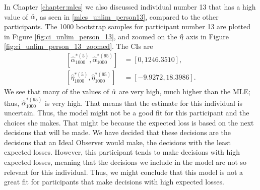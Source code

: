 In Chapter \ref{chapter:mles} we also discussed individual number 13 that has a high value of $\hat{\alpha}$, as seen in \eqref{mles_unlim_person13}, compared to the other participants. The 1000 bootstrap samples for participant number 13 are plotted in Figure \ref{fig:ci_unlim_person_13}, and zoomed on the $\hat{\eta}$ axis in Figure \ref{fig:ci_unlim_person_13_zoomed}. The CIs are
\begin{equation*}
    \begin{aligned}
         \left[ \hat{\alpha}^{*(5)}_{1000},\hat{\alpha}^{*(95)}_{1000}\right] &= [0,1246.3510],\\
         \left[\hat{\eta}^{*(5)}_{1000},\hat{\eta}^{*(95)}_{1000}\right] &= [-9.9272,18.3986].
    \end{aligned}
\end{equation*}
We see that many of the values of $\hat{\alpha}$ are very high, much higher than the MLE; thus, $\hat{\alpha}^{*(95)}_{1000}$ is very high. That means that the estimate for this individual is uncertain. Thus, the model might not be a good fit for this participant and the choices she makes. That might be because the expected loss is based on the next decisions that will be made. We have decided that these decisions are the decisions that an Ideal Observer would make, the decisions with the least expected losses. However, this participant tends to make decisions with high expected losses, meaning that the decisions we include in the model are not so relevant for this individual. Thus, we might conclude that this model is not a great fit for participants that make decisions with high expected losses. 
